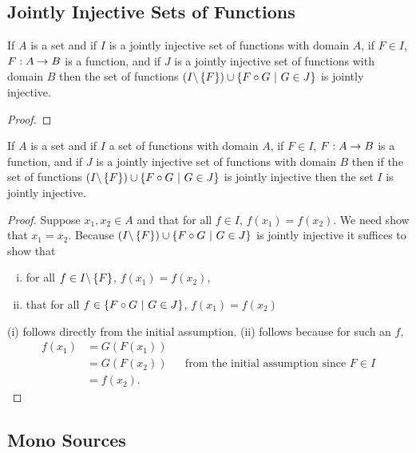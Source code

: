 \subsection{Jointly Injective Sets of Functions}
\begin{lemma}
\label{jointlyinjectivecomposition}
If $A$ is a set and if $I$  is a jointly injective set of functions with domain $A$, if $F \in I$, $F: A \rightarrow B$ is a function,
and if $J$ is a jointly injective set of functions with domain $B$ then the set of functions
$(I \backslash \left\{F\right\}) \cup \left\{F \circ G \ \middle|\ G \in J\right\}$ is jointly injective.
\end{lemma}
\begin{proof}

\end{proof}

\begin{lemma}
\label{jointlyinjectivefactorisation}
If $A$ is a set and if $I$  a set of functions with domain $A$, if $F \in I$, $F: A \rightarrow B$ is a function,
and if $J$ is a jointly injective set of functions with domain $B$ then if the set of functions
$(I \backslash \left\{F\right\}) \cup \left\{F \circ G \ \middle|\ G \in J\right\}$ is jointly injective then the
set $I$ is jointly injective.
\end{lemma}
\begin{proof}
Suppose $x_1,x_2 \in A$ and that for all $f \in I$, $f(x_1)=f(x_2)$. We need show that $x_1=x_2$.
Because $(I \backslash \left\{F\right\}) \cup \left\{F \circ G \ \middle|\ G \in J\right\}$ is jointly injective
it suffices to show that 
\begin{enumerate}[(i)]
\item
for all $f \in I \backslash \left\{F\right\}$, $f(x_1)=f(x_2)$, 
\item that for all $f \in \left\{F \circ G \ \middle|\ G \in J\right\}$, $f(x_1)=f(x_2)$
\end{enumerate}
(i) follows directly from the initial assumption. 
(ii) follows because for such an $f$, 
\begin{align*}
f(x_1)&=G(F(x_1)) & & \\
      &=G(F(x_2)) & & \mbox{from the initial assumption since }F \in I \\
			&=f(x_2). & &
\end{align*}
\end{proof}

\subsection{Mono Sources}

